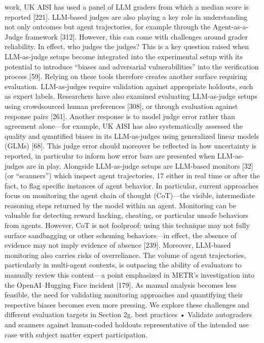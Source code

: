 work, UK AISI has used a panel of LLM graders from which a median score is reported [221]. LLM-based
judges are also playing a key role in understanding not only outcomes but agent trajectories, for example
through the Agent-as-a-Judge framework [312].
However, this can come with challenges around grader reliability. In effect, who judges the judges? This is
a key question raised when LLM-as-judge setups become integrated into the experimental setup with its
potential to introduce “biases and adversarial vulnerabilities” into the verification process [59]. Relying on
these tools therefore creates another surface requiring evaluation. LLM-as-judges require validation against
appropriate holdouts, such as expert labels. Researchers have also examined evaluating LLM-as-judge
setups using crowdsourced human preferences [308], or through evaluation against response pairs [261].
Another response is to model judge error rather than agreement alone—for example, UK AISI has also
systematically assessed the quality and quantified biases in its LLM-as-judges using generalized linear
models (GLMs) [68]. This judge error should moreover be reflected in how uncertainty is reported, in
particular to inform how error bars are presented when LLM-as-judges are in play.
Alongside LLM-as-judge setups are LLM-based monitors [32] (or “scanners”) which inspect agent trajectories,
17
either in real time or after the fact, to flag specific instances of agent behavior. In particular, current
approaches focus on monitoring the agent chain of thought (CoT)—the visible, intermediate reasoning
steps returned by the model within an agent. Monitoring can be valuable for detecting reward hacking,
cheating, or particular unsafe behaviors from agents. However, CoT is not foolproof; using this technique
may not fully surface sandbagging or other scheming behaviors—in effect, the absence of evidence may not
imply evidence of absence [239]. Moreover, LLM-based monitoring also carries risks of overreliance. The
volume of agent trajectories, particularly in multi-agent contexts, is outpacing the ability of evaluators to
manually review this content—a point emphasized in METR’s investigation into the OpenAI–Hugging Face
incident [179]. As manual analysis becomes less feasible, the need for validating monitoring approaches
and quantifying their respective biases becomes even more pressing. We explore these challenges and
different evaluation targets in Section 2g.
best practices
• Validate autograders and scanners against human-coded holdouts representative of the intended use case
with subject matter expert participation.
